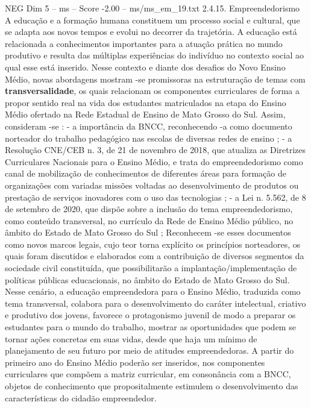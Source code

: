 \begin{textsample}{NEG Dim 5 – ms – Score -2.00 – ms/ms\_em\_19.txt}  \label{ex:f5_neg_072}
2.4.15.
Empreendedorismo A educação e a formação humana constituem um processo social e cultural, que se adapta aos novos tempos e evolui no decorrer da trajetória.
A educação está relacionada a conhecimentos importantes para a atuação prática no mundo produtivo e resulta das múltiplas experiências do indivíduo no contexto social ao qual esse está inserido.
Nesse contexto e diante dos desafios do Novo Ensino Médio, novas abordagens mostram -se promissoras na estruturação de temas com \textbf{transversalidade}, os quais relacionam os componentes curriculares de forma a propor sentido real na vida dos estudantes matriculados na etapa do Ensino Médio ofertado na Rede Estadual de Ensino de Mato Grosso do Sul.
Assim, consideram -se : - a importância da BNCC, reconhecendo -a como documento norteador do trabalho pedagógico nas escolas de diversas redes de ensino ; - a Resolução CNE/CEB n. 3, de 21 de novembro de 2018, que atualiza as Diretrizes Curriculares Nacionais para o Ensino Médio, e trata do empreendedorismo como canal de mobilização de conhecimentos de diferentes áreas para formação de organizações com variadas missões voltadas ao desenvolvimento de produtos ou prestação de serviços inovadores com o uso das tecnologias ; - a Lei n. 5.562, de 8 de setembro de 2020, que dispõe sobre a inclusão do tema empreendedorismo, como conteúdo transversal, no currículo da Rede de Ensino Médio público, no âmbito do Estado de Mato Grosso do Sul ; Reconhecem -se esses documentos como novos marcos legais, cujo teor torna explícito os princípios norteadores, os quais foram discutidos e elaborados com a contribuição de diversos segmentos da sociedade civil constituída, que possibilitarão a implantação/implementação de políticas públicas educacionais, no âmbito do Estado de Mato Grosso do Sul.
Nesse cenário, a educação empreendedora para o Ensino Médio, traduzida como tema transversal, colabora para o desenvolvimento do caráter intelectual, criativo e produtivo dos jovens, favorece o protagonismo juvenil de modo a preparar os estudantes para o mundo do trabalho, mostrar as oportunidades que podem se tornar ações concretas em suas vidas, desde que haja um mínimo de planejamento de seu futuro por meio de atitudes empreendedoras.
A partir do primeiro ano do Ensino Médio poderão ser inseridos, nos componentes curriculares que compõem a matriz curricular, em consonância com a BNCC, objetos de conhecimento que propositalmente estimulem o desenvolvimento das características do cidadão empreendedor.

\end{textsample}
